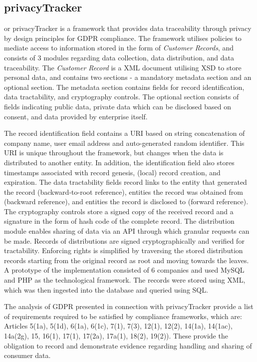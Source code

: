 \subsection*{privacyTracker}
or privacyTracker \cite{gjermundrod_privacytracker_2016} is a framework that provides data traceability through privacy by design principles for GDPR compliance. The framework utilises policies to mediate access to information stored in the form of \textit{Customer Records}, and consists of 3 modules regarding data collection, data distribution, and data traceability. The \textit{Customer Record} is a XML document utilising XSD to store personal data, and contains two sections - a mandatory metadata section and an optional section. The metadata section contains fields for record identification, data tractability, and cryptography controls. The optional section consists of fields indicating public data, private data which can be disclosed based on consent, and data provided by enterprise itself.

The record identification field contains a URI based on string concatenation of company name, user email address and auto-generated random identifier. This URI is unique throughout the framework, but changes when the data is distributed to another entity. In addition, the identification field also stores timestamps associated with record genesis, (local) record creation, and expiration. The data tractability fields record links to the entity that generated the record (backward-to-root reference), entities the record was obtained from (backward reference), and entities the record is disclosed to (forward reference). The cryptography controls store a signed copy of the received record and a signature in the form of hash code of the complete record.
The distribution module enables sharing of data via an API through which granular requests can be made. Records of distributions are signed cryptographically and verified for tractability.
Enforcing rights is simplified by traversing the stored distribution records starting from the original record as root and moving towards the leaves.
A prototype of the implementation consisted of 6 companies and used MySQL and PHP as the technological framework. The records were stored using XML, which was then ingested into the database and queried using SQL.

The analysis of GDPR presented in connection with privacyTracker provide a list of requirements required to be satisfied by compliance frameworks, which are: Articles 5(1a), 5(1d), 6(1a), 6(1c), 7(1), 7(3), 12(1), 12(2), 14(1a), 14(1ac), 14a(2g), 15, 16(1), 17(1), 17(2a), 17a(1), 18(2), 19(2)). These provide the obligation to record and demonstrate evidence regarding handling and sharing of consumer data. 

